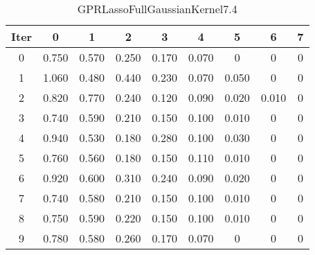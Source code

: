 \begin{table}
	\begin{center}
		\begin{tabular}{|c|c|c|c|c|c|c|c|c|}
			\hline
			Iter & 0 & 1 & 2 & 3 & 4 & 5 & 6 & 7 \\
			\hline
			0 & 0.750 & 0.570 & 0.250 & 0.170 & 0.070 & 0 & 0 & 0 \\
			\hline
			1 & 1.060 & 0.480 & 0.440 & 0.230 & 0.070 & 0.050 & 0 & 0 \\
			\hline
			2 & 0.820 & 0.770 & 0.240 & 0.120 & 0.090 & 0.020 & 0.010 & 0 \\
			\hline
			3 & 0.740 & 0.590 & 0.210 & 0.150 & 0.100 & 0.010 & 0 & 0 \\
			\hline
			4 & 0.940 & 0.530 & 0.180 & 0.280 & 0.100 & 0.030 & 0 & 0 \\
			\hline
			5 & 0.760 & 0.560 & 0.180 & 0.150 & 0.110 & 0.010 & 0 & 0 \\
			\hline
			6 & 0.920 & 0.600 & 0.310 & 0.240 & 0.090 & 0.020 & 0 & 0 \\
			\hline
			7 & 0.740 & 0.580 & 0.210 & 0.150 & 0.100 & 0.010 & 0 & 0 \\
			\hline
			8 & 0.750 & 0.590 & 0.220 & 0.150 & 0.100 & 0.010 & 0 & 0 \\
			\hline
			9 & 0.780 & 0.580 & 0.260 & 0.170 & 0.070 & 0 & 0 & 0 \\
			\hline
		\end{tabular}
	\end{center}
	\caption{GPRLassoFullGaussianKernel7.4}
\end{table}